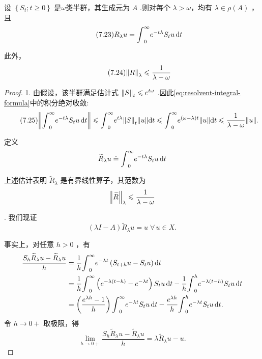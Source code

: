 \begin{theorem}[预解式的积分表达式]\label{thm:resolvent-integral}
设 $\left\{  {{S}_{t};t \geq  0}\right\}$ 是$\omega$类半群，其生成元为 $A$ .则对每个 $\lambda  > \omega$，均有 $\lambda  \in  \rho \left( A\right)$ ，且
\begin{equation}\tag{7.23}\label{eq:resolvent-integral-formula}
{R}_{\lambda }u = {\int }_{0}^{\infty }{e}^{-{t\lambda }}{S}_{t}{u\mathop{}\!\mathrm{d} t}
\end{equation}

此外，
\begin{equation}\tag{7.24}\label{eq:resolvent-bound}
\norm{R}_{\lambda } \leqslant  \frac{1}{\lambda  - \omega }
\end{equation}


\end{theorem}
\begin{proof}
1. 由假设，该半群满足估计式 $\norm{S}_{t} \leqslant  {e}^{t\omega }$ .因此\eqref{eq:resolvent-integral-formula}中的积分绝对收敛:
\begin{equation}\tag{7.25}\label{eq:resolvent-integral-estimate}
\norm{{\int }_{0}^{\infty }{e}^{-{t\lambda }}{S}_{t}{u\mathop{}\!\mathrm{d} t}} \leqslant  {\int }_{0}^{\infty }{e}^{t\lambda }\norm{S}_{t}\| u\| {\mathop{}\!\mathrm{d} t} \leqslant  {\int }_{0}^{\infty }{e}^{\left( {\omega  - \lambda }\right) t}\| u\| {\mathop{}\!\mathrm{d} t} \leqslant  \frac{1}{\lambda  - \omega }\| u\| .
\end{equation}

定义
\[
{\widetilde{R}}_{\lambda }u \doteq  {\int }_{0}^{\infty }{e}^{-{t\lambda }}{S}_{t}{u\mathop{}\!\mathrm{d} t}
\]

上述估计表明 ${\widetilde{R}}_{\lambda }$ 是有界线性算子，其范数为
\[
\norm{\widetilde{R}}_{\lambda } \leqslant  \frac{1}{\lambda  - \omega }
\]

. 我们现证
\begin{equation}\tag{7.26}\label{eq:resolvent-surjective}
\left( {{\lambda I} - A}\right) {\widetilde{R}}_{\lambda }u = u\;\forall\,u \in  X.
\end{equation}

事实上，对任意 $h > 0$ ，有
{\begin{align*}
    \frac{{S}_{h}{\widetilde{R}}_{\lambda }u - {\widetilde{R}}_{\lambda }u}{h} &= \frac{1}{h}{\int }_{0}^{\infty }{e}^{-{\lambda t}}\left( {{S}_{t + h}u - {S}_{t}u}\right) {\mathop{}\!\mathrm{d} t} \\
    &= \frac{1}{h}{\int }_{0}^{\infty }\left( {{e}^{-\lambda \left( {t - h}\right) } - {e}^{-{\lambda t}}}\right) {S}_{t}{u\mathop{}\!\mathrm{d} t} - \frac{1}{h}{\int }_{0}^{h}{e}^{-\lambda \left( {t - h}\right) }{S}_{t}{u\mathop{}\!\mathrm{d} t} \\
    &= \left( \frac{{e}^{\lambda h} - 1}{h}\right) {\int }_{0}^{\infty }{e}^{-{\lambda t}}{S}_{t}{u\mathop{}\!\mathrm{d} t} - \frac{{e}^{\lambda h}}{h}{\int }_{0}^{h}{e}^{-{\lambda t}}{S}_{t}{u\mathop{}\!\mathrm{d} t}.
\end{align*}}
令 $h \rightarrow  0 +$ 取极限，得
\[
\mathop{\lim }\limits_{{h \rightarrow  0 + }}\frac{{S}_{h}{\widetilde{R}}_{\lambda }u - {\widetilde{R}}_{\lambda }u}{h} = \lambda {\widetilde{R}}_{\lambda }u - u.
\]


\end{proof}
